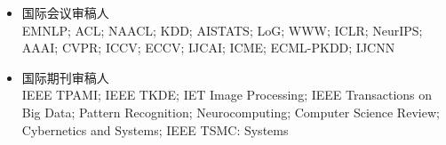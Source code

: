 \begin{itemize}
  \item 国际会议审稿人\\
  EMNLP; ACL; NAACL; KDD; AISTATS; LoG; WWW; ICLR; NeurIPS; AAAI; CVPR; ICCV; ECCV; IJCAI; ICME; ECML-PKDD; IJCNN
  \item 国际期刊审稿人\\
  IEEE TPAMI; IEEE TKDE; IET Image Processing; IEEE Transactions on Big Data; Pattern Recognition; Neurocomputing; Computer Science Review; Cybernetics and Systems; IEEE TSMC: Systems
\end{itemize}
